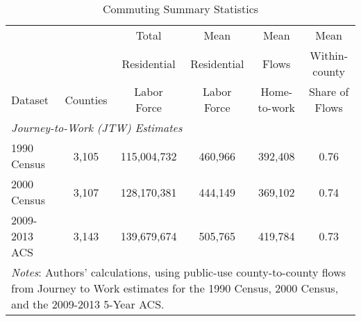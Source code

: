 \begin{table}\centering
\caption{Commuting Summary Statistics \label{tab:comstat}}
\begin{tabular}{lccccc}
\hline\hline
 & & Total & Mean & Mean & Mean \\ 
 & & Residential & Residential & Flows & Within-county \\ 
Dataset & Counties & Labor Force & Labor Force & Home-to-work & Share of Flows \\ 
\hline
\multicolumn{6}{l}{\emph{Journey-to-Work (JTW) Estimates}}\\
1990 Census & 3,105 &   115,004,732 & 460,966 & 392,408 & 0.76 \\ 
2000 Census & 3,107 &   128,170,381 & 444,149 & 369,102 & 0.74 \\ 
2009-2013 ACS & 3,143 & 139,679,674 & 505,765 & 419,784 & 0.73 \\ 

\hline
\multicolumn{6}{p{6in}}{\footnotesize \textit{Notes}: Authors' calculations, using public-use county-to-county flows from Journey to Work estimates for the 1990 Census, 2000 Census, and the 2009-2013 5-Year ACS.}\\
\end{tabular}
\end{table}
